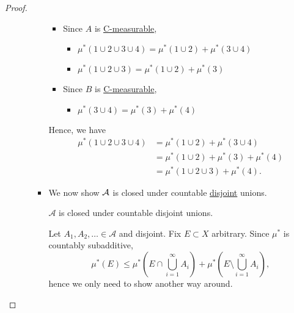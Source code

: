 \begin{proof}
\begin{enumerate}
\begin{enumerate}
\begin{itemize}
\begin{explanation}
					                  \begin{itemize}
						                  \item Since \(A\) is \hyperref[def:C-measurable]{C-measurable},
						                        \begin{itemize}
							                        \item \(\mu^{*} (1\cup 2\cup 3\cup 4) = \mu^{*} (1\cup 2) + \mu^{*} (3\cup 4)\)
							                        \item \(\mu^{*} (1\cup 2\cup 3) = \mu^{*} (1\cup 2) + \mu^{*} (3)\)
						                        \end{itemize}
						                  \item Since \(B\) is \hyperref[def:C-measurable]{C-measurable},
						                        \begin{itemize}
							                        \item \(\mu^{*} (3\cup 4) = \mu^{*} (3) + \mu^{*} (4)\)
						                        \end{itemize}
					                  \end{itemize}
					                  Hence, we have
					                  \[
						                  \begin{split}
							                  \mu^{*} (1\cup 2\cup 3\cup 4) &= \mu^{*} (1\cup 2)+\mu^{*} (3\cup 4)\\
							                  &= \mu^{*} (1\cup 2) + \mu^{*} (3) + \mu^{*} (4)\\
							                  &= \mu^{*}(1\cup 2\cup 3) + \mu^{*} (4).
						                  \end{split}
					                  \]
				                  \end{explanation}
				            \item We now show \(\mathcal{\MakeUppercase{a}} \) is closed under countable \underline{disjoint} unions.
				                  \begin{claim}
					                  \(\mathcal{A} \) is closed under countable disjoint unions.
				                  \end{claim}
				                  \begin{explanation}
					                  Let \(A_1, A_2, \ldots \in\mathcal{A}\) and disjoint.
					                  Fix \(E\subset X\) arbitrary. Since \(\mu^{*} \) is countably subadditive,
					                  \[
						                  \mu^{*} (E) \leq  \mu^{*} \left(E\cap \bigcup\limits_{i=1}^{\infty} A_{i}\right) + \mu^{*} \left(E\setminus \bigcup\limits_{i=1}^{\infty} A_{i}\right),
					                  \]
					                  hence we only need to show another way around.


\end{explanation}
\end{itemize}
\end{enumerate}
\end{enumerate}
\end{proof}
